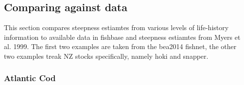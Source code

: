 \documentclass{dragonfly-report}
\begin{document}
\subsection{Comparing against data}

This section compares steepness estiamtes from various levels of life-history information to available data in fishbase and steepness estiamtes from Myers et al. 1999. The first two examples are taken from the bea2014 fishnet, the other two examples treak NZ stocks specifically, namely hoki and snapper.

\begin{knitrout}
\color{fgcolor}\begin{kframe}
\begin{alltt}
 \hlkwb{<-} 

 \hlkwb{<-} \hlstd{(}\hlstd{,}
                         \hlstd{,}
                         \hlstd{,}\hlstd{=}\hlstd{(}\hlstd{,}\hlstd{,}\hlstd{,}\hlstd{))\{}
   \hlkwb{=} \hlopt{==}

   \hlkwb{<-} 
   \hlkwb{<-} 
  \hlstd{(} \hlopt{+}
    \hlstd{(}\hlstd{(}  \hlopt{+}
    \hlstd{(}\hlstd{=}\hlstd{(}\hlstd{,}\hlstd{,}\hlstd{),}\hlstd{=}\hlstd{)} \hlopt{+}
    \hlstd{(}\hlopt{~}\hlstd{=}\hlstd{)} \hlopt{+}
    \hlstd{(}\hlstd{=}\hlstd{,}\hlstd{=}\hlstd{)} \hlopt{+}
    \hlstd{(}\hlstd{=}\hlstd{(}\hlstd{=}\hlstd{))}
\hlstd{\}}
\end{alltt}
\end{kframe}
\end{knitrout}

\subsubsection{Atlantic Cod}
\end{document}
